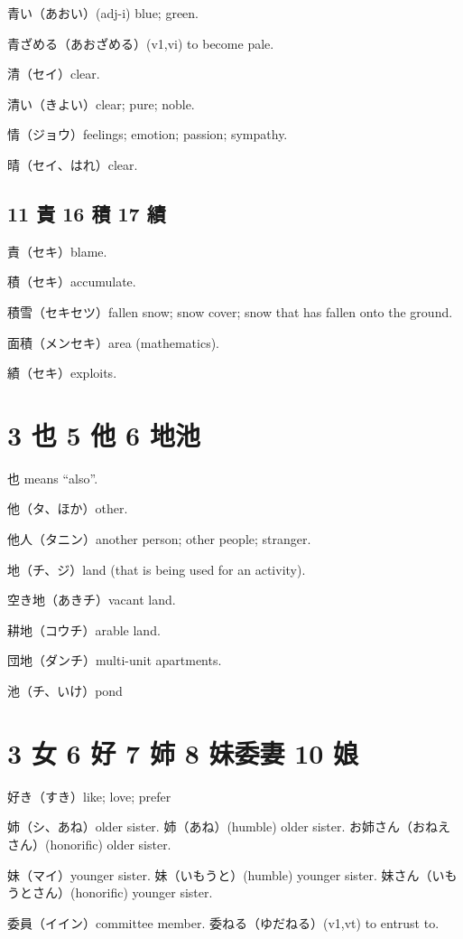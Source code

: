 青い（あおい）(adj-i) blue; green.

青ざめる（あおざめる）(v1,vi) to become pale.

清（セイ）clear.

清い（きよい）clear; pure; noble.

情（ジョウ）feelings; emotion; passion; sympathy.

晴（セイ、はれ）clear.

\subsection{11 責 16 積 17 績}

責（セキ）blame.

積（セキ）accumulate.

積雪（セキセツ）fallen snow;
snow cover;
snow that has fallen onto the ground.

面積（メンセキ）area (mathematics).

績（セキ）exploits.

\section{3 也 5 他 6 地池}

也 means ``also''.

他（タ、ほか）other.

他人（タニン）another person; other people; stranger.

地（チ、ジ）land (that is being used for an activity).

空き地（あきチ）vacant land.

耕地（コウチ）arable land.

団地（ダンチ）multi-unit apartments.

池（チ、いけ）pond

\section{3 女 6 好 7 姉 8 妹委妻 10 娘}

好き（すき）like; love; prefer

姉（シ、あね）older sister.
姉（あね）(humble) older sister.
お姉さん（おねえさん）(honorific) older sister.

妹（マイ）younger sister.
妹（いもうと）(humble) younger sister.
妹さん（いもうとさん）(honorific) younger sister.

委員（イイン）committee member.
委ねる（ゆだねる）(v1,vt) to entrust to.

